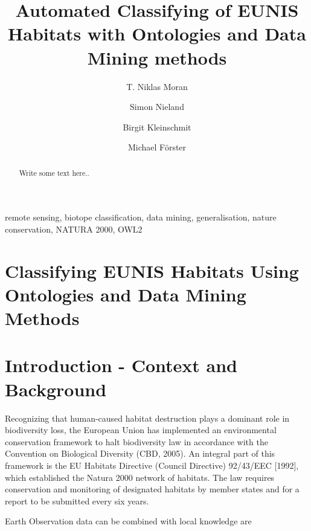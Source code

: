 \documentclass[authoryear, review,12pt,number]{elsarticle}
\begin{document}
\begin{frontmatter}
\linenumbers
\title{Automated Classifying of EUNIS Habitats with Ontologies and Data Mining
methods}


\author[TUB]{T. Niklas Moran}

\author[TUB]{Simon Nieland}
\author[TUB]{Birgit Kleinschmit}

\author[TUB]{Michael F\"orster}

\address[TUB]{Geoinformation in Environmental Planning Lab, Technische
Universit\"at Berlin, Stra\ss e des 17. Juni 145, 10623 Berlin, Germany}

\begin{abstract}
Write some text here..
\end{abstract}

\begin{keyword}
remote sensing, biotope classification, data mining,
generalisation, nature conservation, NATURA 2000, OWL2
\end{keyword}

\end{frontmatter}

\linenumbers
\section{Classifying EUNIS Habitats Using Ontologies and Data Mining Methods}

\section{Introduction - Context and Background}
Recognizing that human-caused habitat destruction plays a dominant role in
biodiversity loss, the European Union has implemented an environmental
conservation framework to halt biodiversity law in accordance with the
Convention on Biological Diversity (CBD, 2005). An integral part of this
framework is the EU Habitats Directive (Council Directive) 92/43/EEC [1992],
which established the Natura 2000 network of habitats. The law requires
conservation and monitoring of designated habitats by member states and for a
report to be submitted every six years. 

Earth Observation data can be combined with local knowledge are
\end{document}
